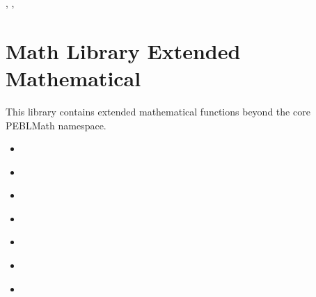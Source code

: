 \documentclass[letterpaper,10pt,english]{sphinxmanual}
\begin{document}
\sphinxAtStartPar
{}

\sphinxAtStartPar
{}, , 

\sphinxstepscope


\section{Math Library \sphinxhyphen{} Extended Mathematical}
\label{\detokenize{reference/math:math-library-extended-mathematical}}\label{\detokenize{reference/math::doc}}
\sphinxAtStartPar
This library contains extended mathematical functions beyond the core PEBLMath namespace.

\begin{sphinxShadowBox}
\begin{itemize}
\item {} 
\sphinxAtStartPar
{}\label{\detokenize{reference/math:id1}}{\hyperref[\detokenize{reference/math:bound}]{}}

\item {} 
\sphinxAtStartPar
{}\label{\detokenize{reference/math:id2}}{\hyperref[\detokenize{reference/math:cumnorminv}]{}}

\item {} 
\sphinxAtStartPar
{}\label{\detokenize{reference/math:id3}}{\hyperref[\detokenize{reference/math:cumsum}]{}}

\item {} 
\sphinxAtStartPar
{}\label{\detokenize{reference/math:id4}}{\hyperref[\detokenize{reference/math:dist}]{}}

\item {} 
\sphinxAtStartPar
{}\label{\detokenize{reference/math:id5}}{\hyperref[\detokenize{reference/math:filter}]{}}

\item {} 
\sphinxAtStartPar
{}\label{\detokenize{reference/math:id6}}{\hyperref[\detokenize{reference/math:match}]{}}

\item {} 
\sphinxAtStartPar
{}\label{\detokenize{reference/math:id7}}{\hyperref[\detokenize{reference/math:normaldensity}]{}}


\end{itemize}
\end{sphinxShadowBox}
\end{document}
